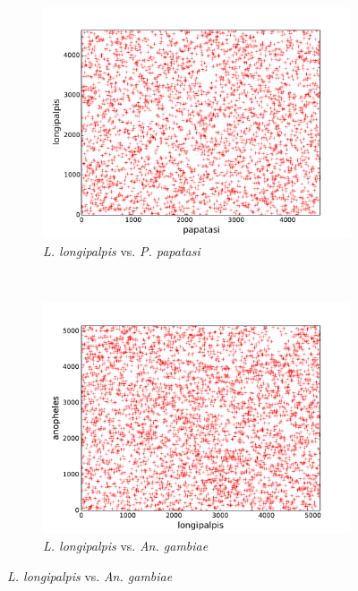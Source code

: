 \begin{figure}[H]
  \centering
  \begin{subfigure}[b]{0.45\textwidth}
    \includegraphics[width=\textwidth]{figures/synteny/papatasi_longipalpis_plot}
    \caption{\emph{L. longipalpis} vs. \emph{P. papatasi}}
    \label{fig:synteny-dotplots-sandflies}
  \end{subfigure}
  \\
  \begin{subfigure}[b]{0.45\textwidth}
    \includegraphics[width=\textwidth]{figures/synteny/longipalpis_anopheles_plot}
    \caption{\emph{L. longipalpis} vs. \emph{An. gambiae}}
    \label{fig:synteny-dotplots-longipalpis-anopheles}
  \end{subfigure}

\end{figure}
